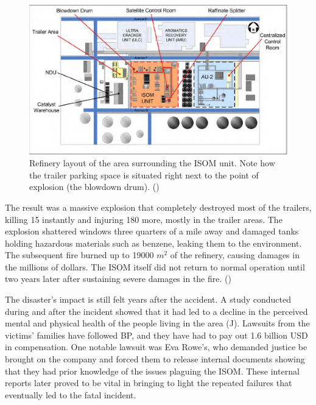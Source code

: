 \documentclass[12pt]{article}
\begin{document}
	\begin{figure}[H]
		\includegraphics[width=\textwidth]{Refinery_layout.png}
		\caption{Refinery layout of the area surrounding the ISOM unit. Note how the trailer parking space is situated right next to the point of explosion (the blowdown drum). (\cite{csbreport})}
		\label{fig:reflayout}
	\end{figure}
	The result was a massive explosion that completely destroyed most of the trailers, killing 15 instantly and injuring 180 more, mostly in the trailer areas. The explosion shattered windows three quarters of a mile away and damaged tanks holding hazardous materials such as benzene, leaking them to the environment. The subsequent fire burned up to 19000 $m^2$ of the refinery, causing damages in the millions of dollars. The ISOM itself did not return to normal operation until two years later after sustaining severe damages in the fire. (\cite{csbreport})
	
	The disaster's impact is still felt years after the accident. A study conducted during and after the incident showed that it had led to a decline in the perceived mental and physical health of the people living in the area (\cite{Peek106}J). Lawsuits from the victims' families have followed BP, and they have had to pay out 1.6 billion USD in compensation. One notable lawsuit was Eva Rowe's, who demanded justice be brought on the company and forced them to release internal documents showing that they had prior knowledge of the issues plaguing the ISOM. These internal reports later proved to be vital in bringing to light the repeated failures that eventually led to the fatal incident.
\end{document}
